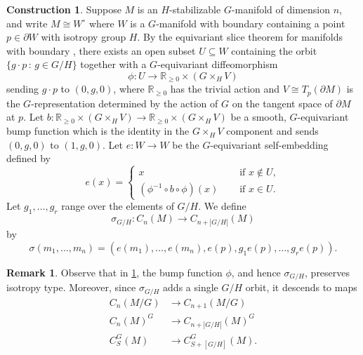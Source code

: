 \documentclass[11pt]{amsart}
\makeatletter
\theoremstyle{definition}
\newtheorem{remark}[equation]{Remark}
\newtheorem{construction}[equation]{Construction}
\numberwithin{equation}{subsection} %
\def\r{\mathbb{R}}
\newcommand{\x}{\times}
\renewcommand{\st}{\hspace{2pt} : \hspace{2pt}}
\newcommand{\isom}{\cong}
\newcommand{\switchmargin}{
\if@reversemargin
\normalmarginpar
\else
\reversemarginpar
\fi
}
\newcommand{\EvaNote}[1]
   {\marginpar{\raggedright\smaller \smaller \color{teal}#1}\switchmargin}
\makeatother
\begin{document}
\begin{construction}\label{Constr:sigmaGH}
Suppose $M$ is an $H$-stabilizable $G$-manifold of dimension $n$, and write $M \isom W^\circ$ where $W$ is a $G$-manifold with boundary containing a point $p \in \partial W$ with isotropy group $H$. By the equivariant slice theorem for manifolds with boundary \cite[Theorem 3.6]{Kan07}, there exists an open subset $U \subseteq W$ containing the orbit $\{ g\cdot p \st g\in G/H \}$ together with a $G$-equivariant diffeomorphism 
$$\phi: U\to \r_{\geq 0} \times (G\x_H V) $$ 
sending $g\cdot p$ to $(0, g,0)$, where $\r_{\geq 0}$ has the trivial action and $V \cong T_p(\partial M)$ is the $G$-representation determined by the action of $G$ on the tangent space of $\partial M$ at $p$. Let $b: \r_{\geq 0} \times (G\x_HV) \to \r_{\geq 0} \times (G\x_HV)$ be a smooth, $G$-equivariant bump function which is the identity in the $G\x_H V$ component and sends $(0,g,0)$ to $(1,g,0)$. Let $e: W \to W$ be the $G$-equivariant self-embedding defined by
$$e(x) = \begin{cases}
	x \quad & \text{ if } x \notin U, \\
	(\phi^{-1} \circ b \circ \phi)(x) \quad & \text{ if } x \in U.
\end{cases}$$
Let $g_1,\ldots,g_r$ range over the elements of $G/H$. We define 
\begin{equation}\label{eq:sigmaGH} \sigma_{G/H}: C_n(M) \to C_{n+|G/H|}(M)\end{equation}
by
$$\sigma(m_1,\ldots,m_n) = (e(m_1),\ldots,e(m_n),e(p),g_1e(p),\ldots,g_re(p)).$$
\end{construction}

\begin{remark}
Observe that in \cref{Constr:sigmaGH}, the bump function $\phi$, and hence $\sigma_{G/H}$, preserves isotropy type. Moreover, since $\sigma_{G/H}$ adds a single $G/H$ orbit, it descends to maps
\begin{align*}
C_n(M/G) & \to C_{n+1}(M/G)
\\C_n(M)^G & \to C_{n+|G/H|}(M)^G
\\C_S^G(M) & \to C_{S+[G/H]}^G(M).
\end{align*}
\end{remark}
\end{document}
